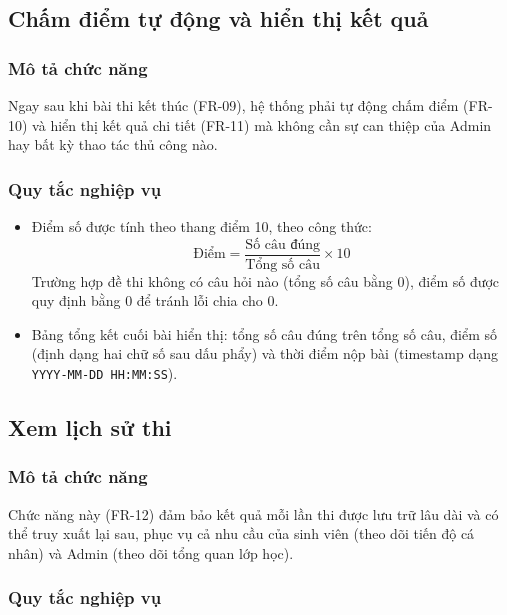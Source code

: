 \documentclass[11pt]{report}
\begin{document}
\subsection{Chấm điểm tự động và hiển thị kết quả}
\label{sec:fr_diem}

\subsubsection{Mô tả chức năng}

Ngay sau khi bài thi kết thúc (FR-09), hệ thống phải tự động chấm điểm (FR-10) và hiển thị kết quả chi tiết (FR-11) mà không cần sự can thiệp của Admin hay bất kỳ thao tác thủ công nào.

\subsubsection{Quy tắc nghiệp vụ}

\begin{itemize}[leftmargin=*]
    \item Điểm số được tính theo thang điểm 10, theo công thức:
    $$ \text{Điểm} = \frac{\text{Số câu đúng}}{\text{Tổng số câu}} \times 10 $$
    Trường hợp đề thi không có câu hỏi nào (tổng số câu bằng 0), điểm số được quy định bằng 0 để tránh lỗi chia cho 0.
    \item Bảng tổng kết cuối bài hiển thị: tổng số câu đúng trên tổng số câu, điểm số (định dạng hai chữ số sau dấu phẩy) và thời điểm nộp bài (timestamp dạng \texttt{YYYY-MM-DD HH:MM:SS}).
\end{itemize}

\subsection{Xem lịch sử thi}

\subsubsection{Mô tả chức năng}

Chức năng này (FR-12) đảm bảo kết quả mỗi lần thi được lưu trữ lâu dài và có thể truy xuất lại sau, phục vụ cả nhu cầu của sinh viên (theo dõi tiến độ cá nhân) và Admin (theo dõi tổng quan lớp học).

\subsubsection{Quy tắc nghiệp vụ}
\end{document}
